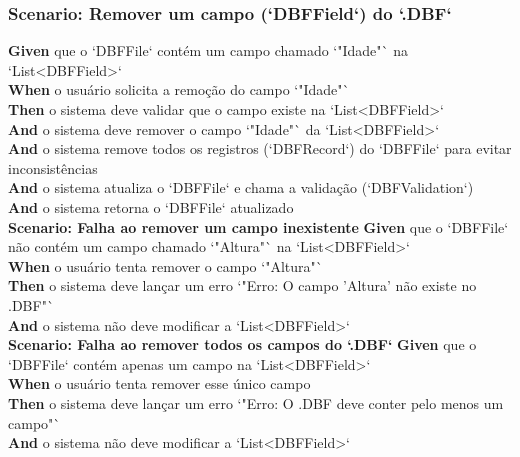 \subsubsection{Scenario: Remover um campo (`DBFField`) do `.DBF`}
\textbf{Given} que o `DBFFile` contém um campo chamado `"Idade"` na `List<DBFField>` \\
\textbf{When} o usuário solicita a remoção do campo `"Idade"` \\
\textbf{Then} o sistema deve validar que o campo existe na `List<DBFField>` \\
\textbf{And} o sistema deve remover o campo `"Idade"` da `List<DBFField>` \\
\textbf{And} o sistema remove todos os registros (`DBFRecord`) do `DBFFile` para evitar inconsistências \\
\textbf{And} o sistema atualiza o `DBFFile` e chama a validação (`DBFValidation`) \\
\textbf{And} o sistema retorna o `DBFFile` atualizado \\

\textbf{Scenario: Falha ao remover um campo inexistente}
\textbf{Given} que o `DBFFile` não contém um campo chamado `"Altura"` na `List<DBFField>` \\
\textbf{When} o usuário tenta remover o campo `"Altura"` \\
\textbf{Then} o sistema deve lançar um erro `"Erro: O campo 'Altura' não existe no .DBF"` \\
\textbf{And} o sistema não deve modificar a `List<DBFField>` \\

\textbf{Scenario: Falha ao remover todos os campos do `.DBF`}
\textbf{Given} que o `DBFFile` contém apenas um campo na `List<DBFField>` \\
\textbf{When} o usuário tenta remover esse único campo \\
\textbf{Then} o sistema deve lançar um erro `"Erro: O .DBF deve conter pelo menos um campo"` \\
\textbf{And} o sistema não deve modificar a `List<DBFField>` \\
